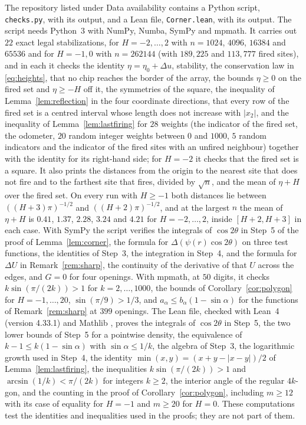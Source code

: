 \documentclass[11pt]{amsart}
\theoremstyle{remark}
\numberwithin{equation}{section}
\begin{document}
The repository listed under Data availability contains a Python script, \texttt{checks.py}, with its output, and a Lean file, \texttt{Corner.lean}, with its output. The script needs Python~3 with NumPy, Numba, SymPy and mpmath. It carries out $22$ exact legal stabilizations, for $H=-2,\dots,2$ with $n=1024$, $4096$, $16384$ and $65536$ and for $H=-1,0$ with $n=262144$ (with $189{,}225$ and $113{,}777$ fired sites), and in each it checks the identity $\eta=\eta_0+\Delta u$, stability, the conservation law in \eqref{eq:heights}, that no chip reaches the border of the array, the bounds $\eta\ge0$ on the fired set and $\eta\ge-H$ off it, the symmetries of the square, the inequality of Lemma~\ref{lem:reflection} in the four coordinate directions, that every row of the fired set is a centred interval whose length does not increase with $|x_2|$, and the inequality of Lemma~\ref{lem:lastfiring} for $28$ weights (the indicator of the fired set, the odometer, $20$ random integer weights between $0$ and $1000$, $5$ random indicators and the indicator of the fired sites with an unfired neighbour) together with the identity for its right-hand side; for $H=-2$ it checks that the fired set is a square. It also prints the distances from the origin to the nearest site that does not fire and to the farthest site that fires, divided by $\sqrt n$, and the mean of $\eta+H$ over the fired set. On every run with $H\ge-1$ both distances lie between $((H+3)\pi)^{-1/2}$ and $((H+2)\pi)^{-1/2}$, and at the largest $n$ the mean of $\eta+H$ is $0.41$, $1.37$, $2.28$, $3.24$ and $4.21$ for $H=-2,\dots,2$, inside $[H+2,H+3]$ in each case. With SymPy the script verifies the integrals of $\cos2\theta$ in Step~5 of the proof of Lemma~\ref{lem:corner}, the formula for $\Delta(\psi(r)\cos2\theta)$ on three test functions, the identities of Step~3, the integration in Step~4, and the formula for $\Delta U$ in Remark~\ref{rem:sharp}, the continuity of the derivative of that $U$ across the edges, and $G=0$ for four openings. With mpmath, at $50$ digits, it checks $k\sin(\pi/(2k))>1$ for $k=2,\dots,1000$, the bounds of Corollary~\ref{cor:polygon} for $H=-1,\dots,20$, $\sin(\pi/9)>1/3$, and $a_\alpha\le b_\alpha(1-\sin\alpha)$ for the functions of Remark~\ref{rem:sharp} at $399$ openings. The Lean file, checked with Lean~4 \cite{MU21} (version 4.33.1) and Mathlib \cite{Mathlib20}, proves the integrals of $\cos2\theta$ in Step~5, the two lower bounds of Step~5 for a pointwise density, the equivalence of $k-1\le k(1-\sin\alpha)$ with $\sin\alpha\le1/k$, the algebra of Step~3, the logarithmic growth used in Step~4, the identity $\min(x,y)=(x+y-|x-y|)/2$ of Lemma~\ref{lem:lastfiring}, the inequalities $k\sin(\pi/(2k))>1$ and $\arcsin(1/k)<\pi/(2k)$ for integers $k\ge2$, the interior angle of the regular $4k$-gon, and the counting in the proof of Corollary~\ref{cor:polygon}, including $m\ge12$ with its case of equality for $H=-1$ and $m\ge20$ for $H=0$. These computations test the identities and inequalities used in the proofs; they are not part of them.
\end{document}
